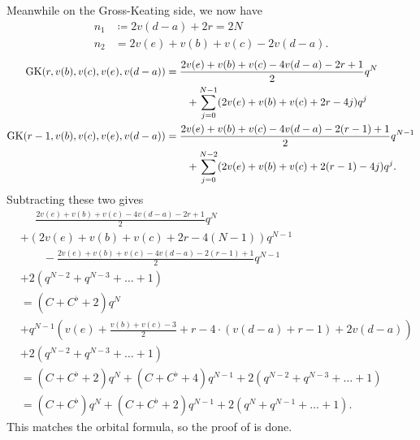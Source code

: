 Meanwhile on the Gross-Keating side, we now have
\begin{align*}
  n_1 &\coloneqq 2v(d-a) + 2r = 2N \\
  n_2 &= 2v(e) + v(b) + v(c) - 2v(d-a).
\end{align*}
\begin{align*}
  \operatorname{GK}(r, v(b), v(c), v(e), v(d-a))
  &= \frac{2v(e)+v(b)+v(c)-4v(d-a)-2r+1}{2} q^{N} \\
    &\qquad+ \sum_{j=0}^{N-1} (2v(e)+v(b)+v(c)+2r-4j) q^j \\
  \operatorname{GK}(r-1, v(b), v(c), v(e), v(d-a))
  &= \frac{2v(e)+v(b)+v(c)-4v(d-a)-2(r-1)+1}{2} q^{N-1} \\
    &\qquad+ \sum_{j=0}^{N-2} (2v(e)+v(b)+v(c)+2(r-1)-4j) q^j.
\end{align*}
Subtracting these two gives
\begin{align*}
  &\phantom= \frac{2v(e)+v(b)+v(c)-4v(d-a)-2r+1}{2} q^{N} \\
  &+ (2v(e)+v(b)+v(c)+2r-4(N-1)) q^{N-1} \\
  &\qquad- \frac{2v(e)+v(b)+v(c)-4v(d-a)-2(r-1)+1}{2} q^{N-1} \\
  &+ 2(q^{N-2} + q^{N-3} + \dots + 1) \\
  &= (C + C^\flat + 2) q^N \\
  &+ q^{N-1} \left( v(e)+\frac{v(b)+v(c)-3}{2} + r - 4 \cdot (v(d-a)+r-1) + 2v(d-a) \right) \\
  &+ 2(q^{N-2} + q^{N-3} + \dots + 1) \\
  &= (C + C^\flat + 2) q^N + (C + C^\flat + 4) q^{N-1} + 2(q^{N-2} + q^{N-3} + \dots + 1) \\
  &= (C + C^\flat) q^N + (C + C^\flat + 2) q^{N-1} + 2(q^N + q^{N-1} + \dots + 1).
\end{align*}
This matches the orbital formula, so the proof of  is done.

